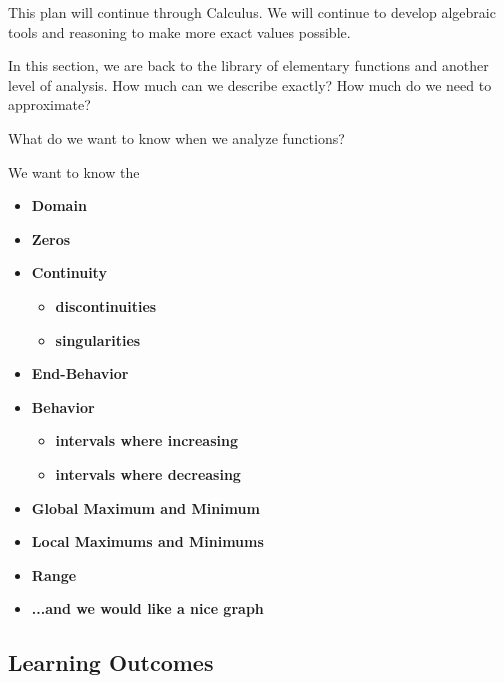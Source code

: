 \documentclass{ximera}
\begin{document}
This plan will continue through Calculus.  We will continue to develop algebraic tools and reasoning to make more exact values possible.

In this section, we are back to the library of elementary functions and another level of analysis.  How much can we describe exactly? How much do we need to approximate?


What do we want to know when we analyze functions?



We want to know the 
\begin{itemize}
     \item \textbf{\textcolor{red!80!black}{Domain}} 
     \item \textbf{\textcolor{red!80!black}{Zeros}} 
     \item \textbf{\textcolor{red!80!black}{Continuity}} 
\begin{itemize}
     \item \textbf{\textcolor{purple!85!blue}{discontinuities}} 
     \item \textbf{\textcolor{purple!85!blue}{singularities}} 
\end{itemize}
     \item \textbf{\textcolor{red!80!black}{End-Behavior}} 
     \item \textbf{\textcolor{red!80!black}{Behavior}} 
\begin{itemize}
     \item \textbf{\textcolor{purple!85!blue}{intervals where increasing}} 
     \item \textbf{\textcolor{purple!85!blue}{intervals where decreasing}} 
\end{itemize}
     \item \textbf{\textcolor{red!80!black}{Global Maximum and Minimum}} 
     \item \textbf{\textcolor{red!80!black}{Local Maximums and Minimums}} 
     \item \textbf{\textcolor{red!80!black}{Range}} 
     \item \textbf{\textcolor{blue!55!black}{...and we would like a nice graph}} 
\end{itemize}










\subsection*{Learning Outcomes}
\end{document}
